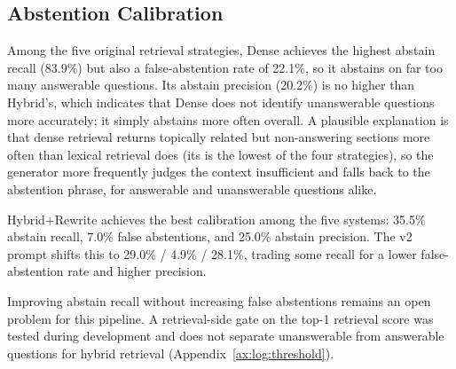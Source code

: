 \subsection{Abstention Calibration}

Among the five original retrieval strategies, Dense achieves the highest abstain
recall (83.9\%) but also a false-abstention rate of 22.1\%, so it abstains on far too
many answerable questions. Its abstain precision (20.2\%) is no higher
than Hybrid's, which indicates that Dense does not identify unanswerable questions
more accurately; it simply abstains more often overall. A plausible explanation is
that dense retrieval returns topically related but non-answering sections more
often than lexical retrieval does (its  is the lowest of the four
strategies), so the generator more frequently judges the context insufficient and
falls back to the abstention phrase, for answerable and unanswerable questions
alike.

Hybrid+Rewrite achieves the best calibration among the five systems: 35.5\% abstain
recall, 7.0\% false abstentions, and 25.0\% abstain precision. The v2 prompt shifts
this to 29.0\% / 4.9\% / 28.1\%, trading some recall for a lower false-abstention
rate and higher precision.

Improving abstain recall without increasing false abstentions remains an open
problem for this pipeline. A retrieval-side gate on the top-1 retrieval score was
tested during development and does not separate unanswerable from answerable
questions for hybrid retrieval (Appendix~\ref{ax:log:threshold}).
